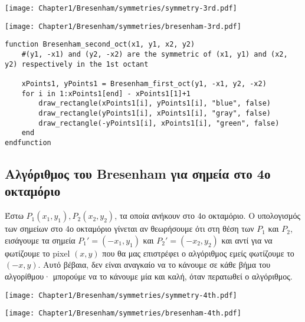 \begin{minipage}{1\textwidth}
	\begin{minipage}[b]{0.48\textwidth} %
	    \centering
	    \texttt{[image: Chapter1/Bresenham/symmetries/symmetry-3rd.pdf]}
	\end{minipage}%
	\hfill
	\begin{minipage}[b]{0.48\textwidth} %
	    \centering
	    \texttt{[image: Chapter1/Bresenham/symmetries/bresenham-3rd.pdf]}
	\end{minipage}
\end{minipage}

\begin{lstlisting}[caption={Bresenham Line Algorithm for 3rd Octant}]
function Bresenham_second_oct(x1, y1, x2, y2) 
	#(y1, -x1) and (y2, -x2) are the symmetric of (x1, y1) and (x2, y2) respectively in the 1st octant
	
	xPoints1, yPoints1 = Bresenham_first_oct(y1, -x1, y2, -x2)  
    for i in 1:xPoints1[end] - xPoints1[1]+1
        draw_rectangle(xPoints1[i], yPoints1[i], "blue", false)
		draw_rectangle(yPoints1[i], xPoints1[i], "gray", false)        
		draw_rectangle(-yPoints1[i], xPoints1[i], "green", false)
    end
endfunction    
\end{lstlisting}



\subsection{Αλγόριθμος του Bresenham για σημεία στο 4ο οκταμόριο}

Έστω $P_1(x_1,y_1), P_2(x_2,y_2)$, τα οποία ανήκουν στο $4$ο οκταμόριο. Ο υπολογισμός των σημείων στο $4$ο οκταμόριο γίνεται αν θεωρήσουμε ότι στη θέση των $P_1$ και $P_2$, εισάγουμε τα σημεία $P_1' = (-x_1, y_1)$ και $P_2' = (-x_2, y_2)$ και αντί για να φωτίζουμε το pixel $(x, y)$ που θα μας επιστρέφει ο αλγόριθμος εμείς φωτίζουμε το $(-x, y)$. Αυτό βέβαια, δεν είναι αναγκαίο να το κάνουμε σε κάθε βήμα του αλγορίθμου· μπορούμε να το κάνουμε μία και καλή, όταν περατωθεί ο αλγόριθμος.


\begin{minipage}{1\textwidth}
	\begin{minipage}[b]{0.48\textwidth} %
	    \centering
	    \texttt{[image: Chapter1/Bresenham/symmetries/symmetry-4th.pdf]}
	\end{minipage}%
	\hfill
	\begin{minipage}[b]{0.48\textwidth} %
	    \centering
	    \texttt{[image: Chapter1/Bresenham/symmetries/bresenham-4th.pdf]}
	\end{minipage}
\end{minipage}

